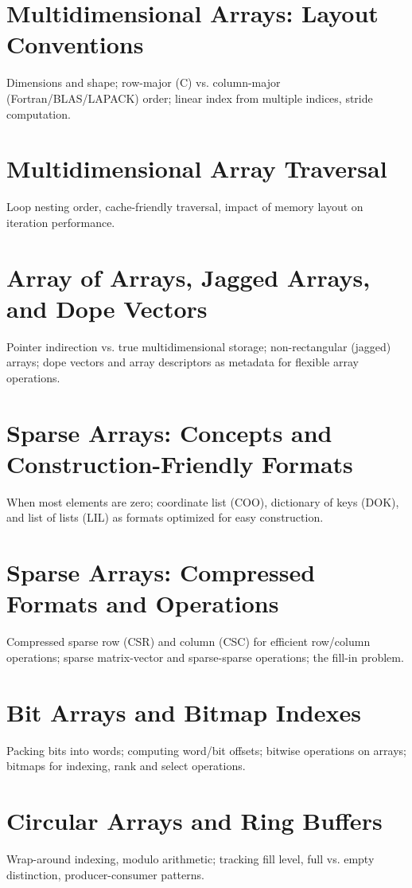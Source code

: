\chapter{Multidimensional Arrays: Layout Conventions}
Dimensions and shape; row-major (C) vs. column-major (Fortran/BLAS/LAPACK) order; linear index from multiple indices, stride computation.

\chapter{Multidimensional Array Traversal}
Loop nesting order, cache-friendly traversal, impact of memory layout on iteration performance.

\chapter{Array of Arrays, Jagged Arrays, and Dope Vectors}
Pointer indirection vs. true multidimensional storage; non-rectangular (jagged) arrays; dope vectors and array descriptors as metadata for flexible array operations.

\chapter{Sparse Arrays: Concepts and Construction-Friendly Formats}
When most elements are zero; coordinate list (COO), dictionary of keys (DOK), and list of lists (LIL) as formats optimized for easy construction.

\chapter{Sparse Arrays: Compressed Formats and Operations}
Compressed sparse row (CSR) and column (CSC) for efficient row/column operations; sparse matrix-vector and sparse-sparse operations; the fill-in problem.

\chapter{Bit Arrays and Bitmap Indexes}
Packing bits into words; computing word/bit offsets; bitwise operations on arrays; bitmaps for indexing, rank and select operations.

\chapter{Circular Arrays and Ring Buffers}
Wrap-around indexing, modulo arithmetic; tracking fill level, full vs. empty distinction, producer-consumer patterns.

